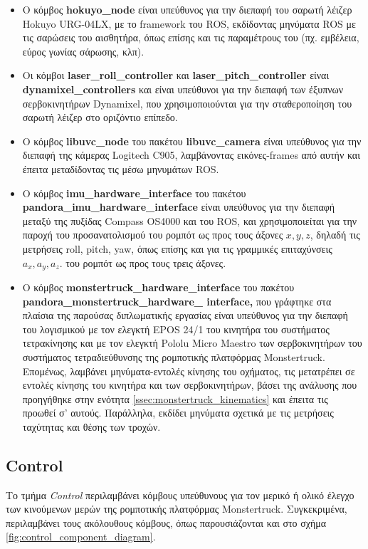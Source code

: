 \begin{itemize}
	\item Ο κόμβος \textbf{hokuyo{\_}node} \cite{hokuyo_node}  είναι υπεύθυνος για την διεπαφή του σαρωτή λέιζερ Hokuyo URG-04LX, με το framework του ROS, εκδίδοντας μηνύματα ROS με τις σαρώσεις του αισθητήρα, όπως επίσης και τις παραμέτρους του (πχ. εμβέλεια, εύρος γωνίας σάρωσης, κλπ).
	\item Οι κόμβοι \textbf{laser{\_}roll{\_}controller} και \textbf{laser{\_}pitch{\_}controller} είναι \textbf{dynamixel{\_}controllers}  \cite{dynamixel_controllers} και είναι υπεύθυνοι για την διεπαφή των έξυπνων σερβοκινητήρων Dynamixel, που χρησιμοποιούνται για την σταθεροποίηση του σαρωτή λέιζερ στο οριζόντιο επίπεδο.
	\item Ο κόμβος \textbf{libuvc{\_}node} του πακέτου \textbf{libuvc{\_}camera} \cite{libuvc} είναι υπεύθυνος για την διεπαφή της κάμερας Logitech C905, λαμβάνοντας εικόνες-frames από αυτήν και έπειτα μεταδίδοντας τις μέσω μηνυμάτων ROS.
	\item Ο κόμβος \textbf{imu{\_}hardware{\_}interface} του πακέτου \textbf{pandora{\_}imu{\_}hardware{\_}interface} είναι υπεύθυνος για την διεπαφή μεταξύ της πυξίδας Compass OS4000 και του ROS, και χρησιμοποιείται για την παροχή του προσανατολισμού του ρομπότ ως προς τους άξονες $x,y,z$, δηλαδή τις μετρήσεις roll, pitch, yaw, όπως επίσης και για τις γραμμικές επιταχύνσεις $a_x,a_y,a_z$. του ρομπότ ως προς τους τρεις άξονες.
	\item Ο κόμβος \textbf{monstertruck{\_}hardware{\_}interface} του πακέτου \textbf{pandora{\_}monstertruck{\_}hardware{\_} interface,} που γράφτηκε στα πλαίσια της παρούσας διπλωματικής εργασίας είναι υπεύθυνος για την διεπαφή του λογισμικού με τον ελεγκτή EPOS 24/1 του κινητήρα του συστήματος τετρακίνησης και με τον ελεγκτή Pololu Micro Maestro των σερβοκινητήρων του συστήματος τετραδιεύθυνσης της ρομποτικής πλατφόρμας Monstertruck. Επομένως, λαμβάνει μηνύματα-εντολές κίνησης του οχήματος, τις μετατρέπει σε εντολές κίνησης του κινητήρα και των σερβοκινητήρων, βάσει της ανάλυσης που προηγήθηκε στην ενότητα \ref{ssec:monstertruck_kinematics} και έπειτα τις προωθεί σ' αυτούς. Παράλληλα, εκδίδει μηνύματα σχετικά με τις μετρήσεις ταχύτητας και θέσης των τροχών.
\end{itemize}

\subsection{Control} \label{ssec:control_component}
Το τμήμα \textit{Control} περιλαμβάνει κόμβους υπεύθυνους για τον μερικό ή ολικό έλεγχο των κινούμενων μερών της ρομποτικής πλατφόρμας Monstertruck. Συγκεκριμένα, περιλαμβάνει τους ακόλουθους κόμβους, όπως παρουσιάζονται και στο σχήμα \ref{fig:control_component_diagram}.

